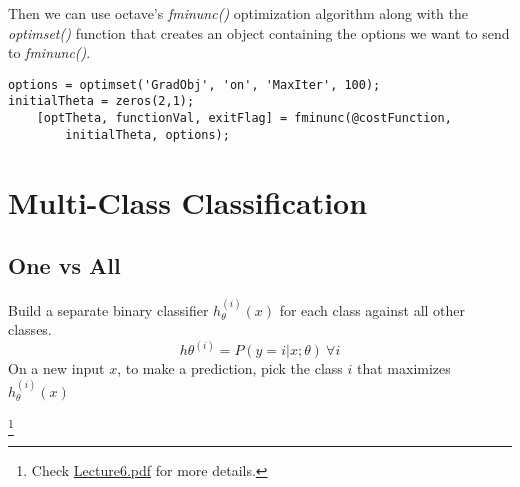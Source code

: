 \documentclass[a4paper, 12pt]{report}
\newcommand\blfootnote[1]{
	\begingroup
	\renewcommand\thefootnote{}\footnote{#1}
	\addtocounter{footnote}{-1}
	\endgroup
}
\begin{document}
Then we can use octave's \emph{fminunc()} optimization algorithm along with the
\emph{optimset()} function that creates an object containing the options we
want to send to \emph{fminunc()}.
\begin{verbatim}
options = optimset('GradObj', 'on', 'MaxIter', 100);
initialTheta = zeros(2,1);
	[optTheta, functionVal, exitFlag] = fminunc(@costFunction, 
		initialTheta, options);
\end{verbatim}

\section{Multi-Class Classification}
\subsection{One vs All}
Build a separate binary classifier $h_\theta^{(i)}(x)$ for each class against all
other classes.
\begin{equation*}
	h\theta^{(i)} = P(y = i | x; \theta)\ \forall i
\end{equation*}
On a new input $x$, to make a prediction, pick the class $i$ that maximizes
$h_\theta^{(i)}(x)$

\blfootnote{Check \href{lecture_pdf/Lecture6.pdf}{Lecture6.pdf} for more details.}

\begin{appendices}
\end{appendices}
\end{document}
